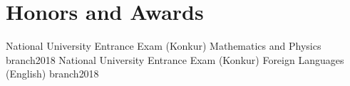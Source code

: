 \section{Honors and Awards}
\resumeSubHeadingListStart
\vspace*{-0.5cm}
    

\resumeSubheading
{}{}
{National University Entrance Exam (Konkur) Mathematics and Physics branch}{2018}
\resumeItemListStart
{}
\resumeItemListEnd
\resumeSubheading
{}{}
{National University Entrance Exam (Konkur) Foreign Languages (English) branch}{2018}
\resumeItemListStart
{}
\resumeItemListEnd




 
\resumeSubHeadingListEnd